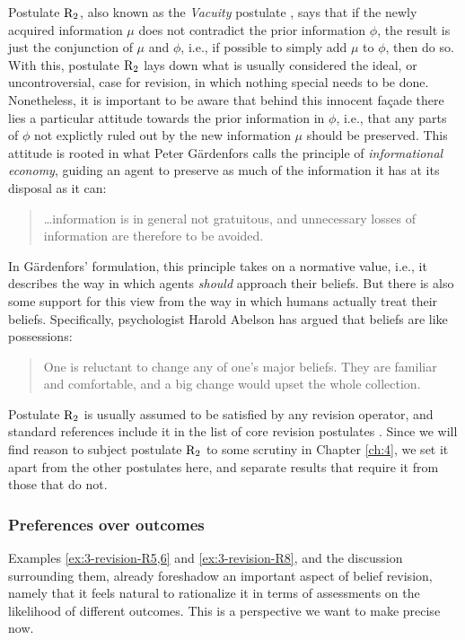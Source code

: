 Postulate $\mathrm{R}_{2}$, also known as the \emph{Vacuity} postulate \cite{FermeH18},
says that if the newly acquired information $\mu$ does not 
contradict the prior information $\phi$,
the result is just the conjunction of $\mu$ and $\phi$,
i.e., if possible to simply add $\mu$ to $\phi$, then do so.
With this, postulate $\mathrm{R}_{2}$ lays down what is usually considered 
the ideal, or uncontroversial, case for revision,
in which nothing special needs to be done.
Nonetheless, it is important to be aware that behind this innocent fa\c{c}ade there lies 
a particular attitude towards the prior information in $\phi$,
i.e., that any parts of $\phi$ not explictly ruled out by the new information $\mu$
should be preserved.
This attitude is rooted in what Peter G\"ardenfors 
calls the principle of \emph{informational economy},
guiding an agent to preserve as much of the information 
it has at its disposal as it can:
\begin{quote}
	\dots information is in general not gratuitous, 
	and unnecessary losses of information are therefore 
	to be avoided. \cite[p.~49]{Gardenfors88}
\end{quote}
In G\"ardenfors' formulation, this principle takes on a 
normative value, i.e., it describes the way in which agents
\emph{should} approach their beliefs.
But there is also some support for this view from the
way in which humans actually treat their beliefs.
Specifically, psychologist Harold Abelson has argued that 
beliefs are like possessions:
\begin{quote}
	One is reluctant to change any of one's major beliefs. 
	They are familiar and comfortable, 
	and a big change would upset the whole collection.
	\cite{Abelson86}
\end{quote} 

Postulate $\mathrm{R}_{2}$ is usually assumed to be 
satisfied by any revision operator,
and standard references include it in the list 
of core revision postulates \cite{KatsunoM92}.
Since we will find reason to subject postulate 
$\mathrm{R}_{2}$ to some scrutiny
in Chapter \ref{ch:4}, we set it apart from 
the other postulates here, and separate results that 
require it from those that do not.

\subsubsection{Preferences over outcomes}
Examples \ref{ex:3-revision-R5,6} and \ref{ex:3-revision-R8}, 
and the discussion surrounding them,
already foreshadow an important aspect of belief revision,
namely that it feels natural to rationalize it in terms of assessments 
on the likelihood of different outcomes.
This is a perspective we want to make precise now.

